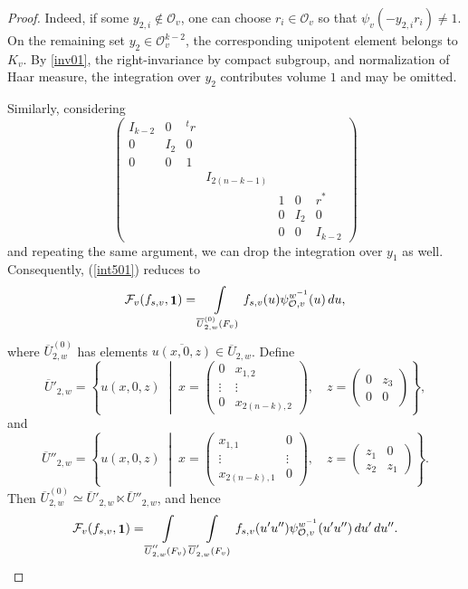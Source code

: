 \documentclass[11pt,notitlepage]{amsart}
\theoremstyle{definition}
\theoremstyle{remark}
\newcommand{\calF}{\mathcal{F}}
\newcommand{\calO}{\mathcal{O}}
\DeclareMathOperator{\id}{{\bf 1}}
\begin{document}
\begin{proof}
Indeed, if some \(y_{2,i}\notin\calO_v\), one can choose \(r_i\in\calO_v\) so that
\(\psi_v(-y_{2,i}r_i)\neq 1\). On the remaining set
\(y_2\in\calO_v^{k-2}\), the corresponding unipotent element belongs to
\(K_v\). By \eqref{inv01}, the right-invariance by compact subgroup, and normalization of Haar measure, the integration
over \(y_2\) contributes volume \(1\) and may be omitted.

Similarly, considering
\begin{equation}\label{r02}
  \begin{pmatrix}
    I_{k-2}&0&^tr&&&&\\
    0&I_2&0&&&&\\
    0&0&1&&&&\\
    &&&I_{2(n-k-1)}&&&\\
    &&&&1&0&r^\ast\\
    &&&&0&I_2&0\\
    &&&&0&0&I_{k-2}
  \end{pmatrix}
\end{equation}
and repeating the same argument, we can drop the integration over $y_1$ as well. Consequently, (\ref{int501}) reduces to
\begin{equation}\label{int502}
  \calF_v(f_{s,v},\id) = \int\limits_{\overline{U}^{(0)}_{2,w}(F_v)} f_{s,v}(u)\psi^{w^{-1}}_{\calO,v}(u)\,du,
\end{equation}
where $\overline{U}^{(0)}_{2,w}$ has elements $\overline{u(x,0,z)}\in \overline{U}_{2,w}$. Define
\[
\overline U'_{2,w}
=
\left\{
u(x,0,z)\;\middle|\;
x=
\begin{pmatrix}
0&x_{1,2}\\
\vdots&\vdots\\
0&x_{2(n-k),2}
\end{pmatrix},
\quad
z=
\begin{pmatrix}
0&z_3\\
0&0
\end{pmatrix}
\right\},
\]
and
\[
\overline U''_{2,w}
=
\left\{
u(x,0,z)\;\middle|\;
x=
\begin{pmatrix}
x_{1,1}&0\\
\vdots&\vdots\\
x_{2(n-k),1}&0
\end{pmatrix},
\quad
z=
\begin{pmatrix}
z_1&0\\
z_2&z_1
\end{pmatrix}
\right\}.
\]
Then $\overline{U}^{(0)}_{2,w}\simeq \overline{U}'_{2,w}\ltimes \overline{U}''_{2,w}$, and hence
\begin{equation}\label{int503}
  \calF_v(f_{s,v},\id)
  = \int\limits_{\overline{U}''_{2,w}(F_v)}\int\limits_{\overline{U}'_{2,w}(F_v)}
  f_{s,v}(u'u'')\psi^{w^{-1}}_{\calO,v}(u'u'')\,du'\,du''.
\end{equation}


\end{proof}
\end{document}
